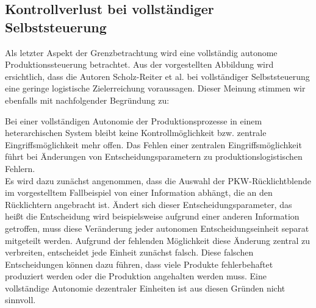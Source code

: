 \subsection{Kontrollverlust bei vollständiger Selbststeuerung}
\label{sec:GrenzenKontrollverlust}

Als letzter Aspekt der Grenzbetrachtung wird eine vollständig autonome
Produktionssteuerung betrachtet. Aus der vorgestellten Abbildung wird
ersichtlich, dass die Autoren Scholz-Reiter et al. bei
vollständiger Selbststeuerung eine geringe logistische Zielerreichung
voraussagen. Dieser Meinung stimmen wir ebenfalls mit nachfolgender Begründung
zu:

Bei einer vollständigen Autonomie der Produktionsprozesse in einem
heterarchischen System bleibt keine Kontrollmöglichkeit bzw. zentrale
Eingriffsmöglichkeit mehr offen. Das Fehlen einer zentralen
Eingriffsmöglichkeit führt bei Änderungen von Entscheidungsparametern zu
produktionslogistischen Fehlern. \hfill \\
Es wird dazu zunächst angenommen, dass die Auswahl der PKW-Rücklichtblende im
vorgestelltem Fallbeispiel von einer Information abhängt, die an den
Rücklichtern angebracht ist. Ändert sich dieser Entscheidungsparameter, das
heißt die Entscheidung wird beispielsweise aufgrund einer anderen Information
getroffen, muss diese Veränderung jeder autonomen Entscheidungseinheit separat
mitgeteilt werden. Aufgrund der fehlenden Möglichkeit diese Änderung zentral zu
verbreiten, entscheidet jede Einheit zunächst falsch. Diese falschen
Entscheidungen können dazu führen, dass viele Produkte fehlerbehaftet
produziert werden oder die Produktion angehalten werden muss. Eine vollständige
Autonomie dezentraler Einheiten ist aus diesen Gründen nicht sinnvoll.

\clearpage